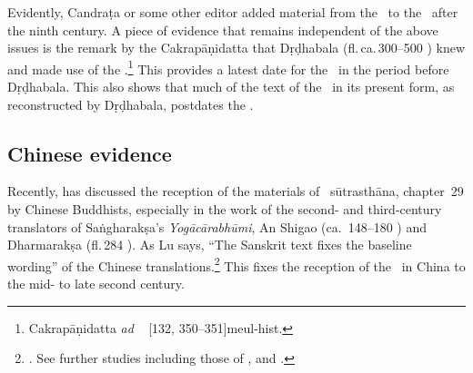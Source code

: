 Evidently, Candraṭa or some other editor added material from the \CS\
to the \SS\ after the ninth century. A piece of evidence that remains
independent of the above issues is the remark by the Cakrapāṇidatta 
that Dṛḍhabala (fl.\,ca.\,300--500 \CE) knew and made use of the
\SS.\footnote{Cakrapāṇidatta \emph{ad} \CS\ \Ca{8.12.39}{735}
    [132, 350--351]{meul-hist}.}  This provides a
    latest date for the \SS\ in the period before Dṛḍhabala.  This also
    shows that much of the text of the \CS\ in its present form, as
    reconstructed by Dṛḍhabala, postdates the \SS.
   
\subsection{Chinese evidence}
   
Recently, \citet{lu-2025} has discussed the reception of the materials
of \SS\ sūtrasthāna, chapter~29 by Chinese Buddhists, especially in
the work of the second- and third-century translators of Saṅgharakṣa's
\emph{Yogācārabhūmi}, An Shigao (ca.\ 148--180 \CE) and Dharmarakṣa
(fl.\,284 \CE).  As Lu says, “The Sanskrit text fixes the baseline
wording” of the Chinese translations.\footnote{\cite[2]{lu-2025}.  See
    further studies including those of  \citet{demi-1954},
    \citet{zacc-2010} and \citet{dele-1997}.}  This fixes the reception of
    the \SS\ in China to the mid- to late second century. 
    
